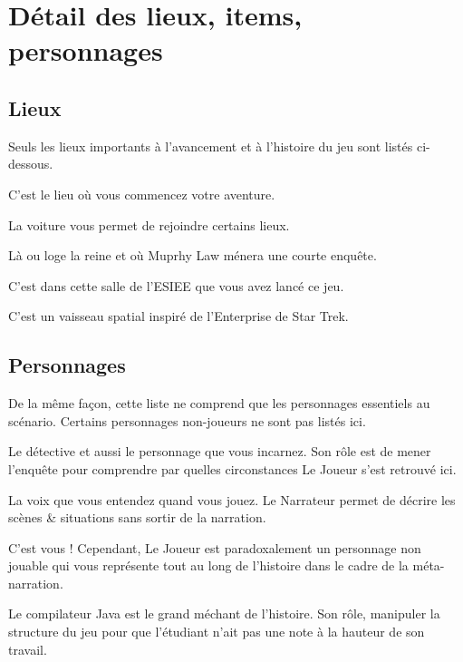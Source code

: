 \section{Détail des lieux, items, personnages}

\subsection{Lieux}

Seuls les lieux importants à l'avancement et à l'histoire du jeu sont listés ci-dessous.

\begin{description}[leftmargin=!,labelwidth=\widthof{\bfseries Palais de Buckingham}]
  \item [Bureau de Murphy] C'est le lieu où vous commencez votre aventure.
  \item [Voiture] La voiture vous permet de rejoindre certains lieux.
  \item [Palais de Buckingham] Là ou loge la reine et où Muprhy Law ménera une courte enquête.
  \item [Salle de l'ESIEE] C'est dans cette salle de l'ESIEE que vous avez lancé ce jeu.
  \item [Vaisseau] C'est un vaisseau spatial inspiré de l'Enterprise de Star Trek.
\end{description}

\subsection{Personnages}

De la même façon, cette liste ne comprend que les personnages essentiels au scénario. Certains personnages non-joueurs ne sont pas listés ici.

\begin{description}[leftmargin=!,labelwidth=\widthof{\bfseries Le Compilateur}]
  \item [Murphy Law] Le détective et aussi le personnage que vous incarnez. Son rôle est de mener l'enquête pour comprendre par quelles circonstances Le Joueur s'est retrouvé ici.
  \item [Le Narrateur] La voix que vous entendez quand vous jouez. Le Narrateur permet de décrire les scènes \& situations sans sortir de la narration. 
  \item [Le Joueur] C'est vous ! Cependant, Le Joueur est paradoxalement un personnage non jouable qui vous représente tout au long de  l'histoire dans le cadre de la méta-narration.
  \item [Le Compilateur] Le compilateur Java est le grand méchant de l'histoire. Son rôle, manipuler la structure du jeu pour que l'étudiant n'ait pas une note à la hauteur de son travail.
\end{description}

